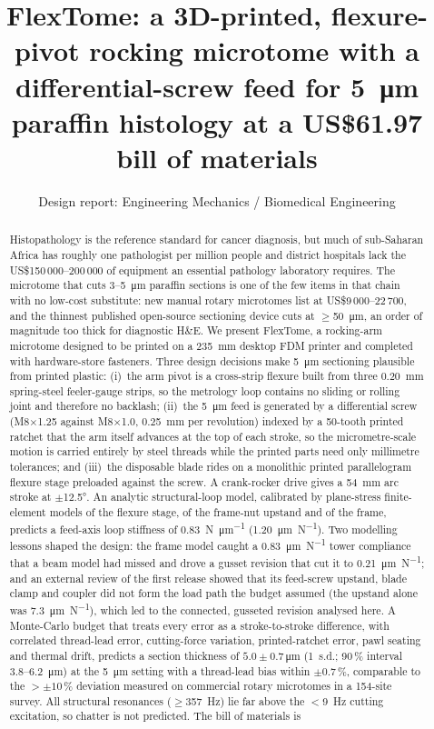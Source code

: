 \documentclass[11pt,a4paper]{article}
\title{\textbf{FlexTome: a 3D-printed, flexure-pivot rocking microtome with a differential-screw feed for \SI{5}{\micro\metre} paraffin histology at a US\$61.97 bill of materials}}
\author{Design report: Engineering Mechanics / Biomedical Engineering}
\date{}
\begin{document}
\maketitle

\begin{abstract}
Histopathology is the reference standard for cancer diagnosis, but much of sub-Saharan Africa has roughly one pathologist per million people and district hospitals lack the US\$150\,000--200\,000 of equipment an essential pathology laboratory requires. The microtome that cuts 3--\SI{5}{\micro\metre} paraffin sections is one of the few items in that chain with no low-cost substitute: new manual rotary microtomes list at US\$9\,000--22\,700, and the thinnest published open-source sectioning device cuts at $\geq$\SI{50}{\micro\metre}, an order of magnitude too thick for diagnostic H\&E. We present FlexTome, a rocking-arm microtome designed to be printed on a \SI{235}{\milli\metre} desktop FDM printer and completed with hardware-store fasteners. Three design decisions make \SI{5}{\micro\metre} sectioning plausible from printed plastic: (i)~the arm pivot is a cross-strip flexure built from three \SI{0.20}{\milli\metre} spring-steel feeler-gauge strips, so the metrology loop contains no sliding or rolling joint and therefore no backlash; (ii)~the \SI{5}{\micro\metre} feed is generated by a differential screw (M8$\times$1.25 against M8$\times$1.0, \SI{0.25}{\milli\metre} per revolution) indexed by a 50-tooth printed ratchet that the arm itself advances at the top of each stroke, so the micrometre-scale motion is carried entirely by steel threads while the printed parts need only millimetre tolerances; and (iii)~the disposable blade rides on a monolithic printed parallelogram flexure stage preloaded against the screw. A crank-rocker drive gives a \SI{54}{\milli\metre} arc stroke at $\pm$\ang{12.5}. An analytic structural-loop model, calibrated by plane-stress finite-element models of the flexure stage, of the frame-nut upstand and of the frame, predicts a feed-axis loop stiffness of \SI{0.83}{\newton\per\micro\metre} (\SI{1.20}{\micro\metre\per\newton}). Two modelling lessons shaped the design: the frame model caught a \SI{0.83}{\micro\metre\per\newton} tower compliance that a beam model had missed and drove a gusset revision that cut it to \SI{0.21}{\micro\metre\per\newton}; and an external review of the first release showed that its feed-screw upstand, blade clamp and coupler did not form the load path the budget assumed (the upstand alone was \SI{7.3}{\micro\metre\per\newton}), which led to the connected, gusseted revision analysed here. A Monte-Carlo budget that treats every error as a stroke-to-stroke difference, with correlated thread-lead error, cutting-force variation, printed-ratchet error, pawl seating and thermal drift, predicts a section thickness of $5.0\pm0.7$\,\si{\micro\metre} (1~s.d.; 90\,\% interval 3.8--\SI{6.2}{\micro\metre}) at the \SI{5}{\micro\metre} setting with a thread-lead bias within $\pm0.7\,\%$, comparable to the $>\pm10\,\%$ deviation measured on commercial rotary microtomes in a 154-site survey. All structural resonances ($\geq$\SI{357}{\hertz}) lie far above the $<$\SI{9}{\hertz} cutting excitation, so chatter is not predicted. The bill of materials is 
\end{abstract}
\end{document}
